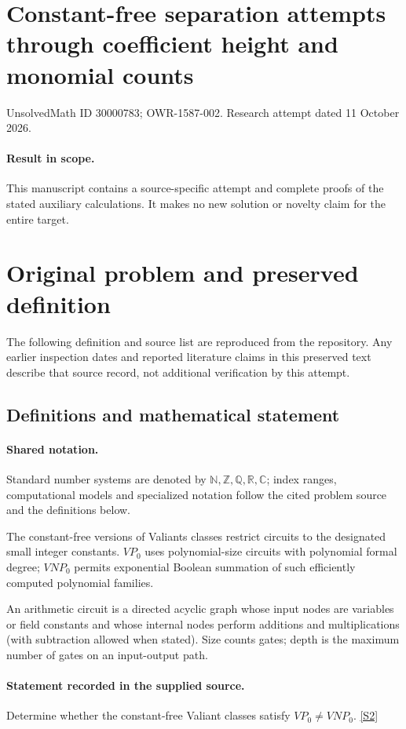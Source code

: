 \documentclass[11pt]{article}
\begin{document}
\section*{Constant-free separation attempts through coefficient height and monomial counts}
\noindent UnsolvedMath ID 30000783; OWR-1587-002. Research attempt dated 11 October 2026.
\paragraph{Result in scope.}This manuscript contains a source-specific attempt and complete proofs of the stated auxiliary calculations. It makes no new solution or novelty claim for the entire target.
\section{Original problem and preserved definition}
The following definition and source list are reproduced from the repository. Any earlier inspection dates and reported literature claims in this preserved text describe that source record, not additional verification by this attempt.
\subsection{Definitions and mathematical statement}

\paragraph{Shared notation.}Standard number systems are denoted by $\mathbb N,\mathbb Z,\mathbb Q,\mathbb R,\mathbb C$; index ranges, computational models and specialized notation follow the cited problem source and the definitions below.


The constant-free versions of Valiant\textquotesingle s classes restrict circuits to the designated small integer constants. $VP_0$ uses polynomial-size circuits with polynomial formal degree; $VNP_0$ permits exponential Boolean summation of such efficiently computed polynomial families.

An arithmetic circuit is a directed acyclic graph whose input nodes are variables or field constants and whose internal nodes perform additions and multiplications (with subtraction allowed when stated). Size counts gates; depth is the maximum number of gates on an input-output path.
\paragraph{Statement recorded in the supplied source.}
Determine whether the constant-free Valiant classes satisfy $VP_0\neq VNP_0$. \href{https://doi.org/10.4171/owr/2007/31}{[S2]}
\end{document}

